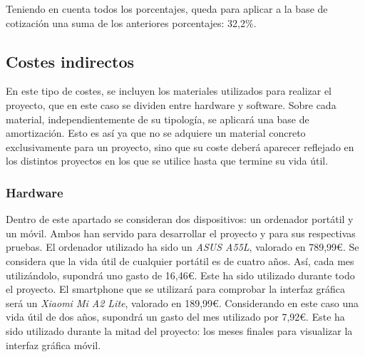 Teniendo en cuenta todos los porcentajes, queda para aplicar a la base de cotización una suma de los anteriores porcentajes: 32,2\%.

\subsection{Costes indirectos}
En este tipo de costes, se incluyen los materiales utilizados para realizar el proyecto, que en este caso se dividen entre hardware y software. Sobre cada material, independientemente de su tipología, se aplicará una base de amortización. Esto es así ya que no se adquiere un material concreto exclusivamente para un proyecto, sino que su coste deberá aparecer reflejado en los distintos proyectos en los que se utilice hasta que termine su vida útil.

\subsubsection{Hardware}
Dentro de este apartado se consideran dos dispositivos: un ordenador portátil y un móvil. Ambos han servido para desarrollar el proyecto y para sus respectivas pruebas.
El ordenador utilizado ha sido un \textit{ASUS A55L}, valorado en 789,99€. Se considera que la vida útil de cualquier portátil es de cuatro años. Así, cada mes utilizándolo, supondrá uno gasto de 16,46€. Este ha sido utilizado durante todo el proyecto.
El smartphone que se utilizará para comprobar la interfaz gráfica será un \textit{Xiaomi Mi A2 Lite}, valorado en 189,99€. Considerando en este caso una vida útil de dos años, supondrá un gasto del mes utilizado por 7,92€. Este ha sido utilizado durante la mitad del proyecto: los meses finales para visualizar la interfaz gráfica móvil.

